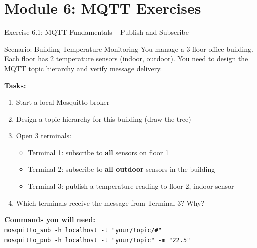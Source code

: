 \documentclass[aspectratio=169,11pt]{beamer}
\begin{document}
\section{Module 6: MQTT Exercises}

\begin{frame}{Exercise 6.1: MQTT Fundamentals -- Publish and Subscribe}
    \begin{block}{Scenario: Building Temperature Monitoring}
        You manage a 3-floor office building. Each floor has 2 temperature sensors (indoor, outdoor). You need to design the MQTT topic hierarchy and verify message delivery.
    \end{block}

    \vspace{0.2cm}
    \textbf{Tasks:}
    \begin{enumerate}
        \item Start a local Mosquitto broker
        \item Design a topic hierarchy for this building (draw the tree)
        \item Open 3 terminals:
        \begin{itemize}
            \item Terminal 1: subscribe to \textbf{all} sensors on floor 1
            \item Terminal 2: subscribe to \textbf{all outdoor} sensors in the building
            \item Terminal 3: publish a temperature reading to floor 2, indoor sensor
        \end{itemize}
        \item Which terminals receive the message from Terminal 3? Why?
    \end{enumerate}

    \vspace{0.1cm}
    \textbf{Commands you will need:}\\
    {\scriptsize\texttt{mosquitto\_sub -h localhost -t "your/topic/\#"}}\\
    {\scriptsize\texttt{mosquitto\_pub -h localhost -t "your/topic" -m "22.5"}}
\end{frame}
\end{document}
